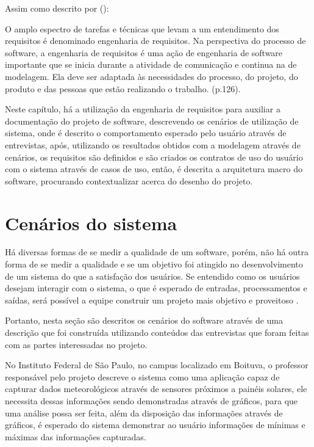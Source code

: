 Assim como descrito por  (\citeyear{engenharia_software_pressman}):

\begin{citacao}
O amplo espectro de tarefas e técnicas que levam a um entendimento dos requisitos é denominado engenharia de requisitos. Na perspectiva do processo de software, a engenharia de requisitos é uma ação de engenharia de software importante que se inicia durante a atividade de comunicação e continua na de modelagem. Ela deve ser adaptada às necessidades do processo, do projeto, do produto e das pessoas que estão realizando o trabalho. (p.126).
\end{citacao}

Neste capítulo, há a utilização da engenharia de requisitos para auxiliar a documentação do projeto de software, descrevendo os cenários de utilização de sistema, onde é descrito o comportamento esperado pelo usuário através de entrevistas, após, utilizando os resultados obtidos com a modelagem através de cenários, os requisitos são definidos e são criados os contratos de uso do usuário com o sistema através de casos de uso, então, é descrita a arquitetura macro do software, procurando contextualizar acerca do desenho do projeto.

\section{Cenários do sistema}

Há diversas formas de se medir a qualidade de um software, porém, não há outra forma de se medir a qualidade e se um objetivo foi atingido no desenvolvimento de um sistema do que a satisfação dos usuários. Se entendido como os usuários desejam interagir com o sistema, o que é esperado de entradas, processamentos e saídas, será possível a equipe construir um projeto mais objetivo e proveitoso \cite{engenharia_software_pressman}. 

Portanto, nesta seção são descritos os cenários do software através de uma descrição que foi construída utilizando conteúdos das entrevistas que foram feitas com as partes interessadas no projeto.

No Instituto Federal de São Paulo, no campus localizado em Boituva, o professor responsável pelo projeto descreve o sistema como uma aplicação capaz de capturar dados meteorológicos através de sensores próximos a painéis solares, ele necessita dessas informações sendo demonstradas através de gráficos, para que uma análise possa ser feita, além da disposição das informações através de gráficos, é esperado do sistema demonstrar ao usuário informações de mínimas e máximas das informações capturadas.

